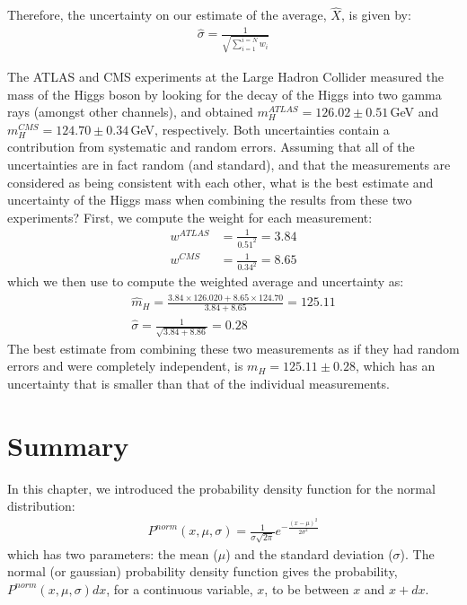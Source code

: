 Therefore, the uncertainty on our estimate of the average, $\hat X$, is given by:
\begin{align}
\hat \sigma=\frac{1}{\sqrt{\sum_{i=1}^{i=N}w_i}}
\end{align}

\begin{example}{}{The ATLAS and CMS experiments at the Large Hadron Collider measured the mass of the Higgs boson by looking for the decay of the Higgs into two gamma rays (amongst other channels), and obtained $m_H^{ATLAS}=126.02 \pm 0.51$\,GeV and $m_H^{CMS}=124.70 \pm 0.34$\,GeV, respectively. Both uncertainties contain a contribution from systematic and random errors. Assuming that all of the uncertainties are in fact random (and standard), and that the measurements are considered as being consistent with each other, what is the best estimate and uncertainty of the Higgs mass when combining the results from these two experiments?}{}
First, we compute the weight for each measurement:
\begin{align*}
w^{ATLAS}&=\frac{1}{0.51^2}=3.84\\
w^{CMS}&=\frac{1}{0.34^2}=8.65
\end{align*}
which we then use to compute the weighted average and uncertainty as:
\begin{align*}
\hat m_H=\frac{3.84\times 126.020+8.65\times 124.70}{3.84+8.65}=125.11\\
\hat \sigma=\frac{1}{\sqrt{3.84+8.86}}=0.28
\end{align*}
The best estimate from combining these two measurements as if they had random errors and were completely independent, is $m_H=125.11\pm0.28$, which has an uncertainty that is smaller than that of the individual measurements. 
\end{example}

\section{Summary}
In this chapter, we introduced the probability density function for the normal distribution:
\begin{align}
P^{norm}(x,\mu,\sigma)=\frac{1}{\sigma\sqrt{2\pi}}e^{-\frac{(x-\mu)^2}{2\sigma^2}}
\end{align}
which has two parameters: the mean ($\mu$) and the standard deviation ($\sigma$). The normal (or gaussian) probability density function gives the probability, $P^{norm}(x,\mu,\sigma)dx$, for a continuous variable, $x$, to be between $x$ and $x+dx$. 

